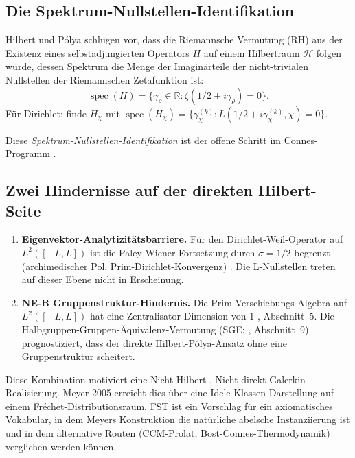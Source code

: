 \documentclass[11pt,a4paper]{article}
\theoremstyle{plain}
\theoremstyle{definition}
\DeclareMathOperator{\spec}{spec}
\newcommand{\R}{\mathbb{R}}
\newcommand{\HH}{\mathcal{H}}
\newcommand{\chifn}{\chi}
\begin{document}
\subsection{Die Spektrum-Nullstellen-Identifikation}

Hilbert und P\'olya schlugen vor, dass die Riemannsche Vermutung (RH) aus der
Existenz eines selbstadjungierten Operators $H$ auf einem Hilbertraum $\HH$ folgen würde,
dessen Spektrum die Menge der Imaginärteile der nicht-trivialen Nullstellen
der Riemannschen Zetafunktion ist:
\begin{equation}
  \spec(H) = \{\gamma_\rho \in \R : \zeta(1/2 + i\gamma_\rho) = 0\}.
\end{equation}
Für Dirichlet: finde $H_\chifn$ mit $\spec(H_\chifn) =
\{\gamma_\chifn^{(k)} : L(1/2 + i\gamma_\chifn^{(k)}, \chifn) = 0\}$.

Diese \emph{Spektrum-Nullstellen-Identifikation} ist der offene Schritt im
Connes-Programm \cite{Connes1999,Connes2026,ConnesConsaniMoscovici2025}.

\subsection{Zwei Hindernisse auf der direkten Hilbert-Seite}

\begin{enumerate}[leftmargin=*]
  \item \textbf{Eigenvektor-Analytizitätsbarriere.} Für den Dirichlet-Weil-Operator
    auf $L^2([-L,L])$ ist die Paley-Wiener-Fortsetzung durch $\sigma = 1/2$ begrenzt
    (archimedischer Pol, Prim-Dirichlet-Konvergenz) \cite{AnalyticKernelV2,C2LayerStatus}.
    Die L-Nullstellen treten auf dieser Ebene nicht in Erscheinung.
  \item \textbf{NE-B Gruppenstruktur-Hindernis.} Die Prim-Verschiebungs-Algebra
    auf $L^2([-L,L])$ hat eine Zentralisator-Dimension von $1$
    \cite{Geiger2026RHII}, Abschnitt~5. Die Halbgruppen-Gruppen-Äquivalenz-Vermutung
    (SGE; \cite{MathMaster}, Abschnitt~9) prognostiziert, dass der direkte
    Hilbert-P\'olya-Ansatz ohne eine Gruppenstruktur scheitert.
\end{enumerate}

Diese Kombination motiviert eine Nicht-Hilbert-, Nicht-direkt-Galerkin-Realisierung.
Meyer 2005 erreicht dies über eine Idele-Klassen-Darstellung auf einem
Fr\'echet-Distributionsraum. FST ist ein Vorschlag für ein axiomatisches Vokabular,
in dem Meyers Konstruktion die natürliche abelsche Instanziierung ist und in dem
alternative Routen (CCM-Prolat, Bost-Connes-Thermodynamik) verglichen werden können.
\end{document}
